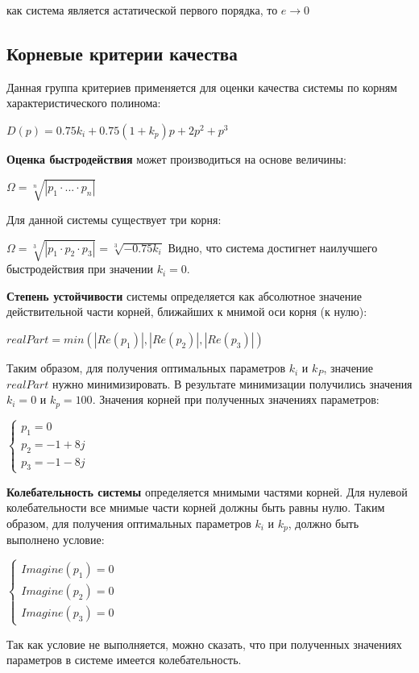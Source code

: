  как система является астатической первого порядка, то $e \rightarrow 0$

\subsection{Корневые критерии качества}

Данная группа критериев применяется для оценки качества системы по корням характеристического полинома:



$D(p)=0.75k_i + 0.75(1 + k_p)p + 2p^2 + p^3$


\textbf{Оценка быстродействия} может производиться на основе величины:


$\Omega=\sqrt[n]{|p_1\cdot...\cdot p_n|}$


Для данной системы существует три корня:

$\Omega=\sqrt[3]{|p_1\cdot p_2\cdot p_3|}=\sqrt[3]{-0.75k_i}$
Видно, что система достигнет наилучшего быстродействия при значении $k_i = 0$.

\textbf{Степень устойчивости} системы определяется как абсолютное значение действительной части корней, ближайших к мнимой оси корня (к нулю):

$realPart = min(|Re(p_1)|, |Re(p_2)|, |Re(p_3)|)$

Таким образом, для получения оптимальных параметров $k_i$ и $k_P$, значение $realPart$ нужно минимизировать. В результате минимизации получились значения $k_i = 0$ и $k_p = 100$. 
Значения корней при полученных значениях параметров:

$\begin{cases}
 p_1 = 0\\p_2 = -1 + 8j\\ p_3 = -1 -8j 
 \end{cases}
 $

\textbf{Колебательность системы} определяется мнимыми частями корней. Для нулевой колебательности все мнимые части корней должны быть равны нулю.
Таким образом, для получения оптимальных параметров $k_i$ и $k_p$, должно быть выполнено условие:

$\begin{cases}
Imagine(p_1)=0\\Imagine(p_2)=0\\Imagine(p_3)=0
\end{cases}
$

Так как условие не выполняется, можно сказать, что при полученных значениях параметров
в системе имеется колебательность.

